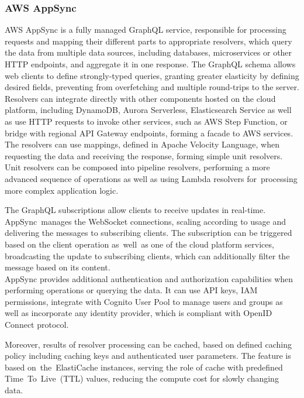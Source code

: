 \subsubsection{AWS AppSync}

AWS AppSync \cite{AppSync} is a fully managed GraphQL service, responsible for processing requests and mapping their different parts to appropriate resolvers, which query the data from multiple data sources, including databases, microservices or other HTTP endpoints, and aggregate it in one response.
The GraphQL schema allows web clients to define strongly-typed queries, granting greater elasticity by defining desired fields, preventing from overfetching and multiple round-trips to the server. \\

Resolvers can integrate directly with other components hosted on the cloud platform, including DynamoDB, Aurora Serverless, Elasticsearch Service as well as use HTTP requests to invoke other services, such as AWS Step Function, or bridge with regional API Gateway endpoints, forming a facade to AWS services.
The resolvers can use mappings, defined in Apache Velocity Language, when requesting the data and receiving the response, forming simple unit resolvers.
Unit resolvers can be composed into pipeline resolvers, performing a more advanced sequence of operations as well as using Lambda resolvers for~processing more complex application logic.

The GraphQL subscriptions allow clients to receive updates in real-time. AppSync~manages the WebSocket connections, scaling according to usage and delivering the messages to subscribing clients.
The subscription can be triggered based on the client operation as~well~as one of the cloud platform services, broadcasting the update to subscribing clients, which can additionally filter the message based on its content. \\

AppSync provides additional authentication and authorization capabilities when performing operations or querying the data.
It can use API keys, IAM permissions, integrate with Cognito User Pool to manage users and groups as well as incorporate any identity provider, which is compliant with OpenID Connect protocol.

Moreover, results of resolver processing can be cached, based on defined caching policy including caching keys and authenticated user parameters.
The feature is based on~the~ElastiCache instances, serving the role of cache with predefined Time~To~Live~(TTL) values, reducing the compute cost for slowly changing data.

